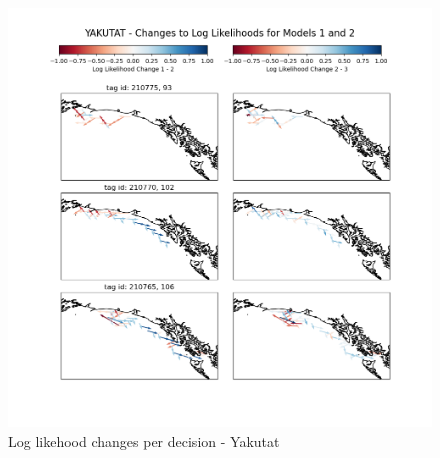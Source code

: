 \documentclass[11pt]{article}
\begin{document}
\begin{figure}[h!] 
	\centering
  \includegraphics[width=140mm]{figures/yakutat_map.png}
  \caption{Log likehood changes per decision - Yakutat}
  \label{fig:yakutat_map}
\end{figure}
\end{document}
